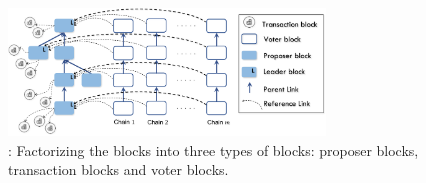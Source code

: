 \fi

%    

\begin{figure}
\begin{center}
\includegraphics[width=0.75\textwidth]{figures/Prism_main.pdf}
\end{center}
    \caption[Prism factors the blocks into three types of blocks.]{\prism: Factorizing the blocks into three types of blocks: proposer blocks, transaction blocks and voter blocks.}
\label{fig:prism}
\end{figure}



